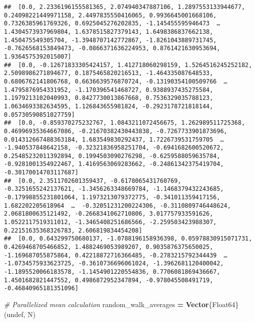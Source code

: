 \documentclass[
]{article}
\newenvironment{Shaded}{\begin{snugshade}}{\end{snugshade}}
\newcommand{\CommentTok}[1]{\textcolor[rgb]{0.56,0.35,0.01}{\textit{#1}}}
\newcommand{\ConstantTok}[1]{\textcolor[rgb]{0.56,0.35,0.01}{#1}}
\newcommand{\DataTypeTok}[1]{\textcolor[rgb]{0.13,0.29,0.53}{#1}}
\newcommand{\FunctionTok}[1]{\textcolor[rgb]{0.13,0.29,0.53}{\textbf{#1}}}
\newcommand{\NormalTok}[1]{#1}
\newcommand{\OperatorTok}[1]{\textcolor[rgb]{0.81,0.36,0.00}{\textbf{#1}}}
\begin{document}
\begin{verbatim}
##  [0.0, 2.2336196155581365, 2.074940347887106, 1.2897553133944677, 0.24098221449971158, 2.4497835550416065, 0.9936645001668106, 0.7326385961769326, 0.6925045276202835, -1.145455595946473  …  1.4304573937969804, 1.6378515827379143, 1.6498386837662138, 1.450475549305704, -1.3948707142772867, -1.8261043889731745, -0.7626568153849473, -0.0866371636224953, 0.8761421630953694, 1.9364575392015007]
##  [0.0, -0.12671833305424157, 1.412718060298159, 1.5264516245252182, 2.5098986271894677, 0.1875465820216513, -1.464335087648533, 0.6806762141806768, 0.6636639576870724, -0.13190354100509766  …  1.4795876954331952, -1.170396541468727, 0.9388937435275584, 1.1979213102040993, 0.8427730013867668, 0.7536329035788123, 1.0634693382634595, 1.126843655981824, -0.2923178721818144, 0.05730590851027759]
##  [0.0, -0.859370275232767, 1.0843211072456675, 1.262989511725368, 0.46996935364667086, -0.21670382430443838, -0.7267733901873696, 0.014312667488363184, 1.683549830292437, 1.7226739531759705  …  -1.940537848642158, -0.32321836958251704, -0.6941682600520672, 0.25485232011392894, 0.1994503090276298, -0.6259588059635784, -0.9281001354922467, 1.4169563069283662, -0.24861342375419704, -0.30170014703117687]
##  [0.0, 2.3511702601359437, -0.6178065431760769, -0.3251655242137621, -1.3456263348669784, -1.1468379432243685, -0.17998855231801064, 1.1973213079372775, -0.341011359417156, 1.682202205618964  …  -0.32051231200224306, -0.3110809746448624, 2.0681800635121492, -0.2668341062710806, 3.017757933591626, 1.0522117519311012, -1.3465408251686566, -2.259503423988307, 0.22151635368326783, 2.606819834454208]
##  [0.0, 0.643299750680137, -1.0788196158936398, 0.05978830915071731, 0.4269468705466852, 1.4882469053989207, 0.9035876375650025, -1.169687055875864, 0.42218872716366485, -0.2783215792344439  …  -1.0734575933623725, -0.3610736696061024, -1.3962681120400042, -1.1895520066183578, -1.1454901220554836, 0.7706081869436667, 1.4501682821447552, 0.4986872952347894, -0.978045508491719, -0.46840965181351096]
\end{verbatim}

\begin{Shaded}
\begin{Highlighting}[]

\CommentTok{\# Parallelized mean calculation}
\NormalTok{random\_walk\_averages }\OperatorTok{=} \FunctionTok{Vector}\DataTypeTok{\{Float64\}}\NormalTok{(}\ConstantTok{undef}\NormalTok{, N)}
\end{Highlighting}
\end{Shaded}
\end{document}
